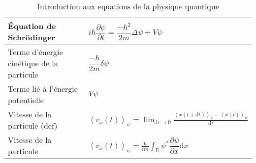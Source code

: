 \documentclass[10pt,a4paper,titlepage,landscape]{article}
\renewcommand{\d}
{
    \mathrm{d}
}
\newcommand*{\dpv}[2]
{
    \dfrac{\partial#1}{\partial#2}
}
\newcommand{\av}[2]
{
    \left\langle#1\right\rangle_{#2}
}
\newcommand{\lap}[1]
{
    \delta#1
}
\newcommand{\rint}
{
    \int_{\mathbb{R}}
}
\begin{document}
\begin{table}[H]
\begin{tabular}{@{}|p{9cm}|p{10cm}@{}|}
        Équation de Schrödinger & $i\hbar \dpv{\psi}{t} = \dfrac{-\hbar ^2}{2m}\Delta \psi+V\psi$ \\ \hline
        Terme d'énergie cinétique de la particule & $\dfrac{-\hbar}{2m}\lap{\psi}$ \\ \hline
        Terme lié à l'énergie potentielle & $V\psi$ \\ \hline
        Vitesse de la particule (def) & $\av{v_x(t)}{\psi} = \displaystyle\lim_{\d t \to0} \frac{\av{x(t+\d t)}{\psi} - \av{x(t)}{\psi}}{\d t}$ \\ \hline
        Vitesse de la particule & $\displaystyle \av{v_x(t)}{\psi} = \frac{\hbar}{im}\rint \psi^* \dpv{\psi}{x}\d x$ \\ \hline
        \end{tabular}
\caption{Introduction aux equations de la physique quantique}
\label{tab:quantphis}
\end{table}
\end{document}
